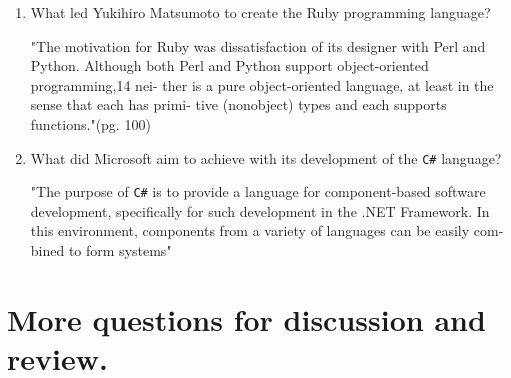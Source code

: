 \begin{enumerate}
  \item What led Yukihiro Matsumoto to create the Ruby programming language?

  \begin{answer}

    "The motivation for Ruby was dissatisfaction of its designer with
    Perl and Python. Although both Perl and Python support
    object-oriented programming,14 nei- ther is a pure object-oriented
    language, at least in the sense that each has primi- tive
    (nonobject) types and each supports functions."(pg. 100)

    \end{answer}

  \item What did Microsoft aim to achieve with its development of the
    \verb+C#+ language?

  \begin{answer}

   "The purpose of \verb+C#+ is to provide a language for component-based
    software development, specifically for such development in the
    .NET Framework. In this environment, components from a variety of
    languages can be easily com- bined to form systems"

    \end{answer}

  \end{enumerate}



\section{More questions for discussion and review.}

